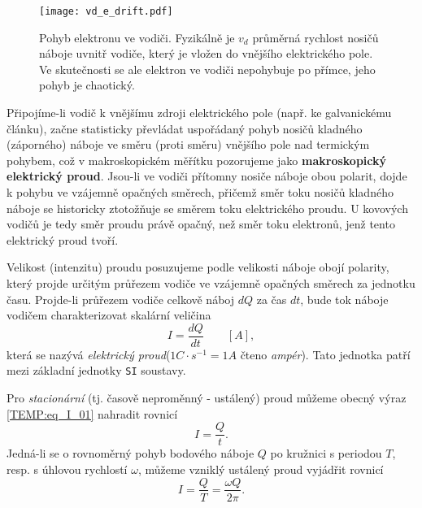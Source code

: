       \begin{figure}
        \centering
        \texttt{[image: vd\_e\_drift.pdf]}
        \caption[Pohyb elektronu ve vodiči.]{Pohyb elektronu ve vodiči. Fyzikálně je $v_d$ 
                 průměrná rychlost nosičů náboje uvnitř vodiče, který je vložen do vnějšího
                 elektrického pole. Ve skutečnosti se ale elektron ve vodiči nepohybuje po přímce,
                 jeho pohyb je chaotický.}
        \label{TEMP:fig_vd_e_drift}
      \end{figure}       
      
      Připojíme-li vodič k vnějšímu zdroji elektrického pole (např. ke galvanickému článku), začne
      statisticky převládat uspořádaný pohyb nosičů kladného (záporného) náboje ve směru (proti
      směru) vnějšího pole nad termickým pohybem, což v makroskopickém měřít\-ku pozorujeme jako
      \textbf{makroskopický elektrický proud}. Jsou-li ve vodiči přítomny nosiče náboje obou
      polarit, dojde k pohybu ve vzájemně opačných směrech, přičemž směr toku nosičů kladného
      náboje se historicky ztotožňuje se směrem toku elektrického proudu. U kovových vodičů je tedy
      směr proudu právě opačný, než směr toku elektronů, jenž tento elektrický proud tvoří.
      
      Velikost (intenzitu) proudu posuzujeme podle velikosti náboje obojí polarity, který projde
      určitým průřezem vodiče ve vzájemně opačných směrech za jednotku času. Projde-li průřezem
      vodiče celkově náboj $dQ$ za čas $dt$, bude tok náboje vodičem charakterizovat skalární
      veličina
        \begin{equation}\label{TEMP:eq_I_01}
          I = \frac{dQ}{dt} \qquad[A],  
        \end{equation}        
      která se nazývá \emph{elektrický proud}($1C\cdot s^{-1} = 1A $ čteno \emph{ampér}). Tato
      jednotka patří mezi základní jednotky \texttt{SI} soustavy.
      
      Pro \emph{stacionární} (tj. časově neproměnný - ustálený) proud můžeme obecný výraz
      \ref{TEMP:eq_I_01} nahradit rovnicí
        \begin{equation}\label{TEMP:eq_I_02}
          I = \frac{Q}{t}.  
        \end{equation}       
      Jedná-li se o rovnoměrný pohyb bodového náboje $Q$ po kružnici s periodou $T$, resp. s
      úhlovou rychlostí $\omega$, můžeme vzniklý ustálený proud vyjádřit rovnicí 
        \begin{equation}\label{TEMP:eq_I_03}
          I = \frac{Q}{T} = \frac{\omega Q}{2\pi}.  
        \end{equation}
      
